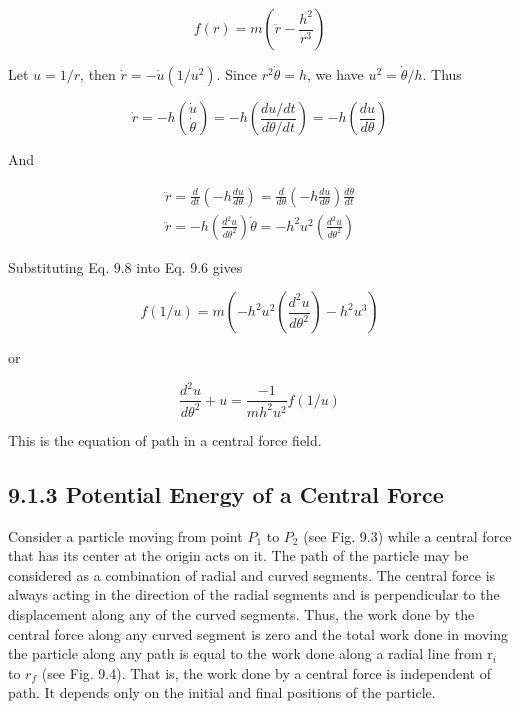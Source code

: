 \documentclass[10pt]{article}
\begin{document}
\begin{equation*}
f(r)=m\left(\ddot{r}-\frac{h^{2}}{r^{3}}\right) \tag{9.6}
\end{equation*}


Let $u=1 / r$, then $\dot{r}=-\dot{u}\left(1 / u^{2}\right)$. Since $r^{2} \dot{\theta}=h$, we have $u^{2}=\dot{\theta} / h$. Thus


\begin{equation*}
\dot{r}=-h\binom{\dot{u}}{\dot{\theta}}=-h\left(\frac{d u / d t}{d \theta / d t}\right)=-h\left(\frac{d u}{d \theta}\right) \tag{9.7}
\end{equation*}


And


\begin{gather*}
\ddot{r}=\frac{d}{d t}\left(-h \frac{d u}{d \theta}\right)=\frac{d}{d \theta}\left(-h \frac{d u}{d \theta}\right) \frac{d \theta}{d t} \\
\ddot{r}=-h\left(\frac{d^{2} u}{d \theta^{2}}\right) \dot{\theta}=-h^{2} u^{2}\left(\frac{d^{2} u}{d \theta^{2}}\right) \tag{9.8}
\end{gather*}


Substituting Eq. 9.8 into Eq. 9.6 gives

$$
f(1 / u)=m\left(-h^{2} u^{2}\left(\frac{d^{2} u}{d \theta^{2}}\right)-h^{2} u^{3}\right)
$$

or


\begin{equation*}
\frac{d^{2} u}{d \theta^{2}}+u=\frac{-1}{m h^{2} u^{2}} f(1 / u) \tag{9.9}
\end{equation*}


This is the equation of path in a central force field.

\subsection*{9.1.3 Potential Energy of a Central Force}
Consider a particle moving from point $P_{1}$ to $P_{2}$ (see Fig. 9.3) while a central force that has its center at the origin acts on it. The path of the particle may be considered as a combination of radial and curved segments. The central force is always acting in the direction of the radial segments and is perpendicular to the displacement along any of the curved segments. Thus, the work done by the central force along any curved segment is zero and the total work done in moving the particle along any path is equal to the work done along a radial line from $\mathrm{r}_{i}$ to $r_{f}$ (see Fig. 9.4). That is, the work done by a central force is independent of path. It depends only on the initial and final positions of the particle.
\end{document}
